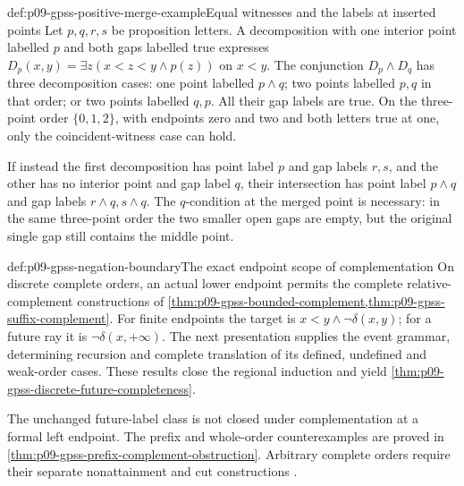 \begin{hbexample}{def:p09-gpss-positive-merge-example}{Equal witnesses and the labels at inserted points}
Let \(p,q,r,s\) be proposition letters. A decomposition with
one interior point labelled \(p\) and both gaps labelled true
expresses \(D_p(x,y)=\exists z(x<z<y\land p(z))\) on
\(x<y\). The conjunction \(D_p\land D_q\) has three
decomposition cases: one point labelled \(p\land q\); two
points labelled \(p,q\) in that order; or two points labelled
\(q,p\). All their gap labels are true. On the three-point
order \(\{0,1,2\}\), with endpoints zero and two and both
letters true at one, only the coincident-witness case can hold.

If instead the first decomposition has point label \(p\)
and gap labels \(r,s\), and the other has no interior point
and gap label \(q\), their intersection has point label
\(p\land q\) and gap labels \(r\land q,s\land q\).
The \(q\)-condition at the merged point is necessary: in
the same three-point order the two smaller open gaps are empty,
but the original single gap still contains the middle point.
\end{hbexample}

\begin{proofboundary}{def:p09-gpss-negation-boundary}{The exact endpoint scope of complementation}
On discrete complete orders, an actual lower endpoint permits the
complete relative-complement constructions of
\cref{thm:p09-gpss-bounded-complement,thm:p09-gpss-suffix-complement}.
For finite endpoints the target is
\(x<y\land\neg\delta(x,y)\); for a future ray it is
\(\neg\delta(x,+\infty)\).
The next presentation supplies the event grammar, determining recursion
and complete translation of its defined, undefined and weak-order cases.
These results close the regional induction and yield
\cref{thm:p09-gpss-discrete-future-completeness}.

The unchanged future-label class is not closed under complementation
at a formal left endpoint. The prefix and whole-order counterexamples
are proved in \cref{thm:p09-gpss-prefix-complement-obstruction}.
Arbitrary complete orders require their separate nonattainment and
cut constructions
\cite[p.~171]{GabbayPnueliShelahStavi1980}.
\end{proofboundary}
